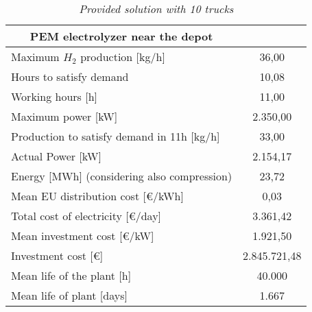 \begin{table}[h]
\centering
\begin{tabular}{cc}
\hline
\rowcolor{bluepoli!40}\multicolumn{2}{|c|}\textbf{PEM electrolyzer near the depot} \\ \hline
\multicolumn{1}{|l|}{Maximum $H_2$ production {[}kg/h{]}}          & \multicolumn{1}{c|}{36,00}          \\ \hline
\multicolumn{1}{|l|}{Hours to satisfy demand}                   & \multicolumn{1}{c|}{10,08}           \\ \hline
\multicolumn{1}{|l|}{Working hours {[}h{]}}                     & \multicolumn{1}{c|}{11,00}           \\ \hline
\multicolumn{1}{|l|}{Maximum power {[}kW{]}}                        & \multicolumn{1}{c|}{2.350,00}    \\ \hline
\multicolumn{1}{|l|}{Production to satisfy demand in 11h {[}kg/h{]}} & \multicolumn{1}{c|}{33,00}         \\ \hline
\multicolumn{1}{|l|}{Actual Power {[}kW{]}}                     & \multicolumn{1}{c|}{2.154,17}       \\ \hline
\multicolumn{1}{|l|}{Energy {[}MWh{]} (considering also compression)}  & \multicolumn{1}{c|}{23,72}   \\ \hline
\multicolumn{1}{|l|}{Mean EU distribution cost {[}€/kWh{]}}           & \multicolumn{1}{c|}{0,03}       \\ \hline
\multicolumn{1}{|l|}{Total cost of electricity {[}€/day{]}}     & \multicolumn{1}{c|}{3.361,42}        \\ \hline
\multicolumn{1}{|l|}{Mean investment cost {[}€/kW{]}}           & \multicolumn{1}{c|}{1.921,50}        \\ \hline
\multicolumn{1}{|l|}{Investment cost {[}€{]}}                   & \multicolumn{1}{c|}{2.845.721,48}  \\ \hline
\multicolumn{1}{|l|}{Mean life of the plant {[}h{]}}            & \multicolumn{1}{c|}{40.000}         \\ \hline
\multicolumn{1}{|l|}{Mean life of plant {[}days{]}}             & \multicolumn{1}{c|}{1.667}          \\ \hline
\end{tabular}
\caption{\textit{Provided solution with 10 trucks}}
\label{tab:Crodo10Trucks}
\end{table}